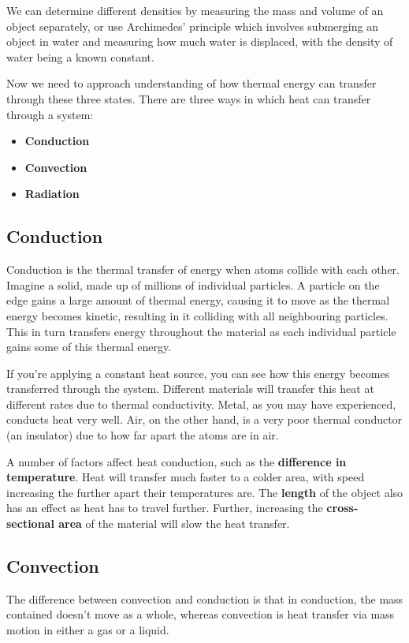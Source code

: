 \documentclass[11pt, titlepage]{article}
\begin{document}
We can determine different densities by measuring the mass and volume of an object separately, or use Archimedes' principle which involves submerging an object in water and measuring how much water is displaced, with the density of water being a known constant.


Now we need to approach understanding of how thermal energy can transfer through these three states.  There are three ways in which heat can transfer through a system:
\begin{itemize}
\item \textbf{Conduction}
\item \textbf{Convection}
\item \textbf{Radiation}
\end{itemize} 

\subsection{Conduction}
Conduction is the thermal transfer of energy when atoms collide with each other.  Imagine a solid, made up of millions of individual particles.  A particle on the edge gains a large amount of thermal energy, causing it to move as the thermal energy becomes kinetic, resulting in it colliding with all neighbouring particles.  This in turn transfers energy throughout the material as each individual particle gains some of this thermal energy.

If you're applying a constant heat source, you can see how this energy becomes transferred through the system.  Different materials will transfer this heat at different rates due to thermal conductivity.  Metal, as you may have experienced, conducts heat very well.  Air, on the other hand, is a very poor thermal conductor (an insulator) due to how far apart the atoms are in air.

A number of factors affect heat conduction, such as the \textbf{difference in temperature}.  Heat will transfer much faster to a colder area, with speed increasing the further apart their temperatures are.  The \textbf{length} of the object also has an effect as heat has to travel further.  Further, increasing the \textbf{cross-sectional area} of the material will slow the heat transfer. 

\subsection{Convection}
The difference between convection and conduction is that in conduction, the mass contained doesn't move as a whole, whereas convection is heat transfer via mass motion in either a gas or a liquid.  
\end{document}
